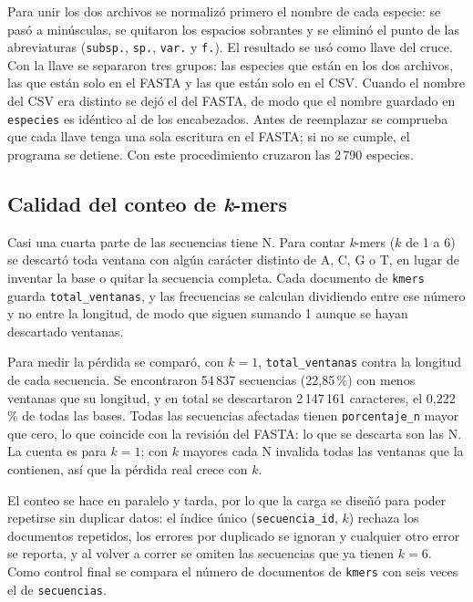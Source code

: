 Para unir los dos archivos se normalizó primero el nombre de cada
especie: se pasó a minúsculas, se quitaron los espacios sobrantes y se
eliminó el punto de las abreviaturas (\texttt{subsp.}, \texttt{sp.},
\texttt{var.} y \texttt{f.}). El resultado se usó como llave del cruce.
Con la llave se separaron tres grupos: las especies que están en los dos
archivos, las que están solo en el FASTA y las que están solo en el CSV.
Cuando el nombre del CSV era distinto se dejó el del FASTA, de modo que
el nombre guardado en \texttt{especies} es idéntico al de los
encabezados. Antes de reemplazar se comprueba que cada llave tenga una
sola escritura en el FASTA; si no se cumple, el programa se detiene. Con
este procedimiento cruzaron las 2\,790 especies.

\subsection*{Calidad del conteo de \textit{k}-mers}

Casi una cuarta parte de las secuencias tiene N. Para contar
\textit{k}-mers ($k$ de 1 a 6) se descartó toda ventana con algún
carácter distinto de A, C, G o T, en lugar de inventar la base o quitar
la secuencia completa. Cada documento de \texttt{kmers} guarda
\texttt{total\_ventanas}, y las frecuencias se calculan dividiendo entre
ese número y no entre la longitud, de modo que siguen sumando 1 aunque
se hayan descartado ventanas.

Para medir la pérdida se comparó, con $k=1$, \texttt{total\_ventanas}
contra la longitud de cada secuencia. Se encontraron 54\,837 secuencias
(22,85\,\%) con menos ventanas que su longitud, y en total se
descartaron 2\,147\,161 caracteres, el 0,222\,\% de todas las bases.
Todas las secuencias afectadas tienen \texttt{porcentaje\_n} mayor que
cero, lo que coincide con la revisión del FASTA: lo que se descarta son
las N. La cuenta es para $k=1$; con $k$ mayores cada N invalida todas
las ventanas que la contienen, así que la pérdida real crece con $k$.

El conteo se hace en paralelo y tarda, por lo que la carga se diseñó
para poder repetirse sin duplicar datos: el índice único
(\texttt{secuencia\_id}, $k$) rechaza los documentos repetidos, los
errores por duplicado se ignoran y cualquier otro error se reporta, y al
volver a correr se omiten las secuencias que ya tienen $k=6$. Como
control final se compara el número de documentos de \texttt{kmers} con
seis veces el de \texttt{secuencias}.

